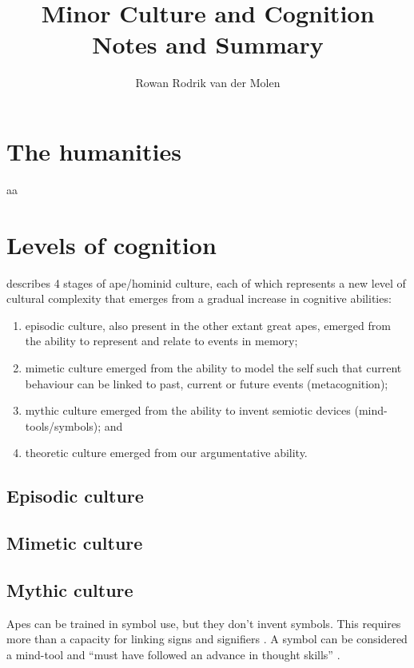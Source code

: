 \documentclass{article}
\title{Minor Culture and Cognition\\Notes and Summary}
\author{Rowan Rodrik van der Molen}
\begin{document}
\maketitle

\tableofcontents

\section{The humanities}

aa
\citet{mesoudi2006}

\section{Levels of cognition}

\citet{donald1991} describes 4 stages of ape/hominid culture, each of which represents a new level of cultural complexity that emerges from a gradual increase in cognitive abilities:

\begin{enumerate}
\item episodic culture, also present in the other extant great apes, emerged from the ability to represent and relate to events in memory;
\item mimetic culture emerged from the ability to model the self such that current behaviour can be linked to past, current or future events (metacognition);
\item mythic culture emerged from the ability to invent semiotic devices (mind-tools/symbols); and
\item theoretic culture emerged from our argumentative ability.
\end{enumerate}

\subsection{Episodic culture}


\subsection{Mimetic culture}

\subsection{Mythic culture}

Apes can be trained in symbol use, but they don't invent symbols. This requires more than a capacity for linking signs and signifiers \citep[p.~217-220]{donald1991}. A symbol can be considered a mind-tool \citep{gregory1981} and ``must have followed an advance in thought skills'' \citep[p.219]{donald1991}.
\end{document}
